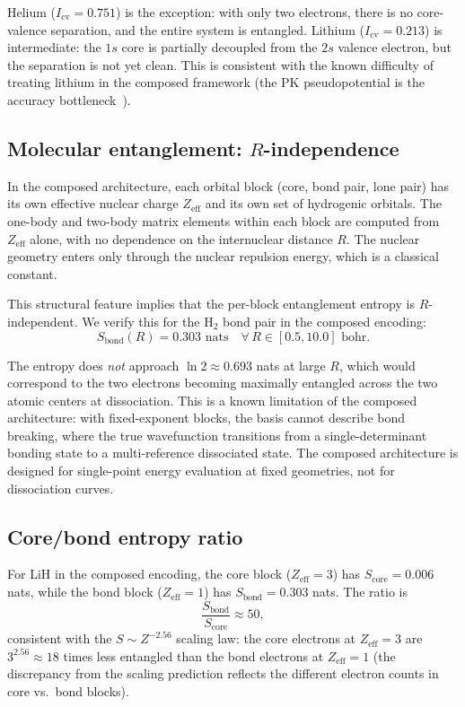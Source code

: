 \documentclass[twocolumn,pra,amsmath,amssymb,superscriptaddress]{revtex4-2}
\begin{document}
Helium ($I_{\text{cv}} = 0.751$) is the exception: with only two
electrons, there is no core-valence separation, and the entire
system is entangled.  Lithium ($I_{\text{cv}} = 0.213$) is
intermediate: the $1s$ core is partially decoupled from the $2s$
valence electron, but the separation is not yet clean.  This is
consistent with the known difficulty of treating lithium in the
composed framework (the PK pseudopotential is the accuracy
bottleneck~\cite{GeoVac_Paper17}).

\subsection{Molecular entanglement: $R$-independence}

In the composed architecture, each orbital block (core, bond pair,
lone pair) has its own effective nuclear charge $Z_{\text{eff}}$
and its own set of hydrogenic orbitals.  The one-body and two-body
matrix elements within each block are computed from $Z_{\text{eff}}$
alone, with no dependence on the internuclear distance $R$.
The nuclear geometry enters only through the nuclear repulsion
energy, which is a classical constant.

This structural feature implies that the per-block entanglement
entropy is $R$-independent.  We verify this for the H$_2$ bond
pair in the composed encoding:
\begin{equation}
  S_{\text{bond}}(R) = 0.303 \text{ nats}
  \quad \forall\, R \in [0.5, 10.0] \text{ bohr}.
  \label{eq:rindep}
\end{equation}

The entropy does \emph{not} approach $\ln 2 \approx 0.693$ nats
at large $R$, which would correspond to the two electrons becoming
maximally entangled across the two atomic centers at dissociation.
This is a known limitation of the composed architecture: with
fixed-exponent blocks, the basis cannot describe bond breaking,
where the true wavefunction transitions from a single-determinant
bonding state to a multi-reference dissociated state.  The
composed architecture is designed for single-point energy
evaluation at fixed geometries, not for dissociation curves.

\subsection{Core/bond entropy ratio}

For LiH in the composed encoding, the core block
($Z_{\text{eff}} = 3$) has $S_{\text{core}} = 0.006$ nats, while
the bond block ($Z_{\text{eff}} = 1$) has
$S_{\text{bond}} = 0.303$ nats.  The ratio is
\begin{equation}
  \frac{S_{\text{bond}}}{S_{\text{core}}} \approx 50,
  \label{eq:ratio}
\end{equation}
consistent with the $S \sim Z^{-2.56}$ scaling law: the core
electrons at $Z_{\text{eff}} = 3$ are $3^{2.56} \approx 18$ times
less entangled than the bond electrons at $Z_{\text{eff}} = 1$
(the discrepancy from the scaling prediction reflects the
different electron counts in core vs.\ bond blocks).
\end{document}
